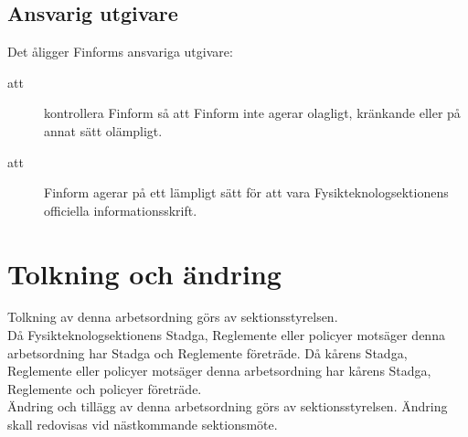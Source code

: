 \subsection{Ansvarig utgivare}
Det åligger Finforms ansvariga utgivare:
    \begin{description}
      \item[att] kontrollera Finform så att Finform inte agerar olagligt, krän\-kan\-de eller på annat sätt olämpligt.
      \item[att] Finform agerar på ett lämpligt sätt för att vara Fysikteknolog\-sek\-tionens officiella informationsskrift.
    \end{description}


\section{Tolkning och ändring}
Tolkning av denna arbetsordning görs av sektionsstyrelsen.\\ Då Fysikteknologsektionens Stadga, Reglemente eller policyer motsäger denna arbetsordning har Stadga och Reglemente företräde. Då kårens Stadga, Reglemente eller policyer motsäger denna arbetsordning har kårens Stadga, Reglemente och policyer företräde.\\
Ändring och tillägg av denna arbetsordning görs av sektionsstyrelsen. Ändring skall redovisas vid nästkommande sektionsmöte. 
\newpage